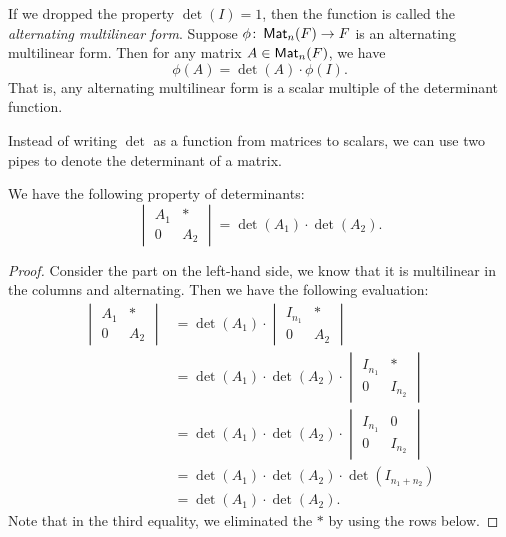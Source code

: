 If we dropped the property $\det(I) = 1$, then the function is called the \emph{alternating multilinear form}. Suppose $\phi \colon \operatorname{\text{\normalfont\sffamily Mat}}_n(F) \to F$ is an alternating multilinear form. Then for any matrix $A \in \operatorname{\text{\normalfont\sffamily Mat}}_n(F)$, we have
\[
  \phi(A) = \det(A) \cdot \phi(I).
\]
That is, any alternating multilinear form is a scalar multiple of the determinant function.

Instead of writing $\det$ as a function from matrices to scalars, we can use two pipes to denote the determinant of a matrix.
\begin{proposition}
  We have the following property of determinants:
  \[
    \begin{vmatrix} A_1 & * \\ 0 & A_2 \end{vmatrix} = \det(A_1) \cdot \det(A_2).
  \]
\end{proposition}
\begin{proof}
  Consider the part on the left-hand side, we know that it is multilinear in the columns and alternating. Then we have the following evaluation:
  \begin{align*}
    \begin{vmatrix} A_1 & * \\ 0 & A_2 \end{vmatrix} & = \det(A_1) \cdot \begin{vmatrix} I_{n_1} & * \\ 0 & A_2 \end{vmatrix}                     \\
                                                     & = \det(A_1) \cdot \det(A_2) \cdot \begin{vmatrix} I_{n_1} & * \\ 0 & I_{n_2} \end{vmatrix} \\
                                                     & = \det(A_1) \cdot \det(A_2) \cdot \begin{vmatrix} I_{n_1} & 0 \\ 0 & I_{n_2} \end{vmatrix} \\
                                                     & = \det(A_1) \cdot \det(A_2) \cdot \det(I_{n_1 + n_2})                                      \\
                                                     & = \det(A_1) \cdot \det(A_2).
  \end{align*}
  Note that in the third equality, we eliminated the $*$ by using the rows below.
\end{proof}

